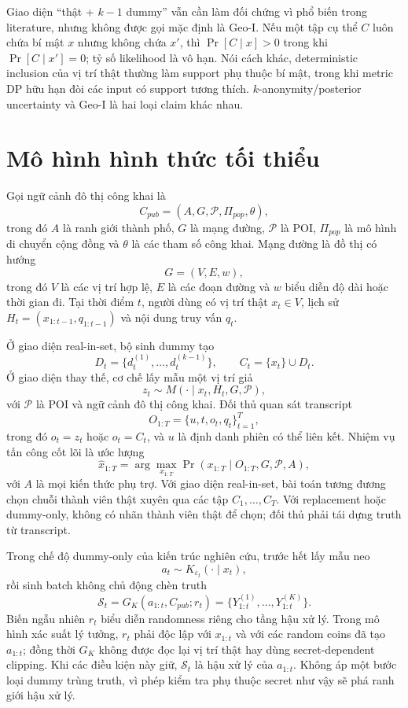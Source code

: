 \documentclass[12pt,a4paper,oneside]{report}
\begin{document}
Giao diện ``thật + $k-1$ dummy'' vẫn cần làm đối chứng vì phổ biến trong literature, nhưng không được gọi mặc định là Geo-I. Nếu một tập cụ thể $C$ luôn chứa bí mật $x$ nhưng không chứa $x'$, thì $\Pr[C\mid x]>0$ trong khi $\Pr[C\mid x']=0$; tỷ số likelihood là vô hạn. Nói cách khác, deterministic inclusion của vị trí thật thường làm support phụ thuộc bí mật, trong khi metric DP hữu hạn đòi các input có support tương thích. $k$-anonymity/posterior uncertainty và Geo-I là hai loại claim khác nhau.

\section{Mô hình hình thức tối thiểu}

Gọi ngữ cảnh đô thị công khai là
\[
C_{pub}=(A,G,\mathcal P,\Pi_{pop},\theta),
\]
trong đó $A$ là ranh giới thành phố, $G$ là mạng đường, $\mathcal P$ là POI, $\Pi_{pop}$ là mô hình di chuyển cộng đồng và $\theta$ là các tham số công khai. Mạng đường là đồ thị có hướng
\[
G=(V,E,w),
\]
trong đó $V$ là các vị trí hợp lệ, $E$ là các đoạn đường và $w$ biểu diễn độ dài hoặc thời gian đi. Tại thời điểm $t$, người dùng có vị trí thật $x_t\in V$, lịch sử $H_t=(x_{1:t-1},q_{1:t-1})$ và nội dung truy vấn $q_t$.

Ở giao diện real-in-set, bộ sinh dummy tạo
\[
D_t=\{d_t^{(1)},\ldots,d_t^{(k-1)}\},\qquad
C_t=\{x_t\}\cup D_t.
\]
Ở giao diện thay thế, cơ chế lấy mẫu một vị trí giả
\[
z_t\sim M(\cdot\mid x_t,H_t,G,\mathcal{P}),
\]
với $\mathcal{P}$ là POI và ngữ cảnh đô thị công khai. Đối thủ quan sát transcript
\[
O_{1:T}=\bigl\{u,t,o_t,q_t\bigr\}_{t=1}^{T},
\]
trong đó $o_t=z_t$ hoặc $o_t=C_t$, và $u$ là định danh phiên có thể liên kết. Nhiệm vụ tấn công cốt lõi là ước lượng
\[
\widehat{x}_{1:T}
=\arg\max_{x_{1:T}}
\Pr\!\left(x_{1:T}\mid O_{1:T},G,\mathcal{P},A\right),
\]
với $A$ là mọi kiến thức phụ trợ. Với giao diện real-in-set, bài toán tương đương chọn chuỗi thành viên thật xuyên qua các tập $C_1,\ldots,C_T$. Với replacement hoặc dummy-only, không có nhãn thành viên thật để chọn; đối thủ phải tái dựng truth từ transcript.

Trong chế độ dummy-only của kiến trúc nghiên cứu, trước hết lấy mẫu neo
\[
a_t\sim K_{\varepsilon_t}(\cdot\mid x_t),
\]
rồi sinh batch không chủ động chèn truth
\[
\mathcal S_t=G_K(a_{1:t},C_{pub};r_t)
=\{Y_{1:t}^{(1)},\ldots,Y_{1:t}^{(K)}\}.
\]
Biến ngẫu nhiên $r_t$ biểu diễn randomness riêng cho tầng hậu xử lý. Trong mô hình xác suất lý tưởng, $r_t$ phải độc lập với $x_{1:t}$ và với các random coins đã tạo $a_{1:t}$; đồng thời $G_K$ không được đọc lại vị trí thật hay dùng secret-dependent clipping. Khi các điều kiện này giữ, $\mathcal S_t$ là hậu xử lý của $a_{1:t}$. Không áp một bước loại dummy trùng truth, vì phép kiểm tra phụ thuộc secret như vậy sẽ phá ranh giới hậu xử lý.
\end{document}
